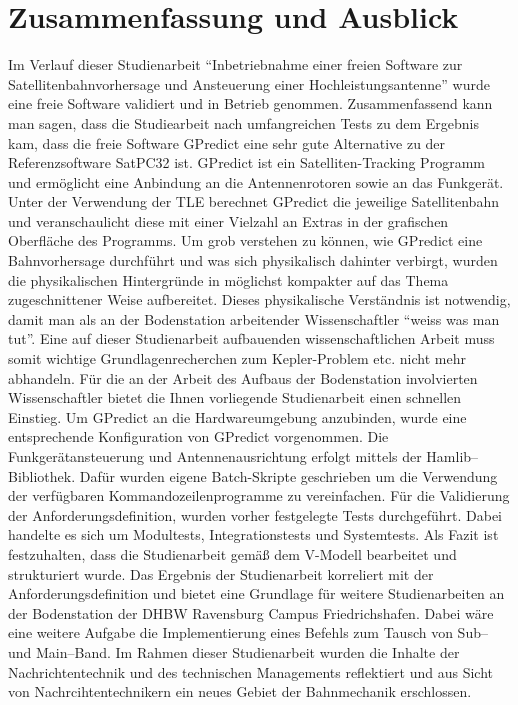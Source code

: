 
\chapter{Zusammenfassung und Ausblick}
Im Verlauf dieser Studienarbeit "`Inbetriebnahme einer freien Software zur Satellitenbahnvorhersage und Ansteuerung einer Hochleistungsantenne"' wurde eine freie Software validiert und in Betrieb genommen. Zusammenfassend kann man sagen, dass die Studiearbeit nach umfangreichen Tests zu dem Ergebnis kam, dass die freie Software GPredict eine sehr gute Alternative zu der Referenzsoftware SatPC32 ist. 
\newpar
GPredict ist ein Satelliten-Tracking Programm und ermöglicht eine Anbindung an die Antennenrotoren sowie 
an das Funkgerät. Unter der Verwendung der \ac{TLE} berechnet GPredict die jeweilige Satellitenbahn und veranschaulicht diese mit einer Vielzahl an Extras in der grafischen Oberfläche des Programms. Um grob verstehen zu können, wie GPredict eine Bahnvorhersage durchführt und was sich physikalisch dahinter verbirgt, wurden die physikalischen Hintergründe in möglichst kompakter auf das Thema zugeschnittener Weise aufbereitet. Dieses physikalische Verständnis ist notwendig, damit man als an der Bodenstation arbeitender Wissenschaftler "`weiss was man tut"'. Eine auf dieser Studienarbeit aufbauenden wissenschaftlichen Arbeit muss somit wichtige Grundlagenrecherchen zum Kepler-Problem etc. nicht mehr abhandeln. Für die an der Arbeit des Aufbaus der Bodenstation involvierten Wissenschaftler bietet die Ihnen vorliegende Studienarbeit einen schnellen Einstieg.     
\newpar
Um GPredict an die Hardwareumgebung anzubinden, wurde eine entsprechende Konfiguration von GPredict vorgenommen. Die Funkgerätansteuerung und Antennenausrichtung erfolgt mittels der Hamlib--Bibliothek. Dafür wurden eigene Batch-Skripte geschrieben um die Verwendung der verfügbaren Kommandozeilenprogramme zu vereinfachen. 
\newpar
Für die Validierung der Anforderungsdefinition, wurden vorher festgelegte Tests durchgeführt. Dabei handelte es sich um Modultests, Integrationstests und Systemtests. 
\newpar
Als Fazit ist festzuhalten, dass die Studienarbeit gemäß dem V-Modell bearbeitet und strukturiert wurde. Das Ergebnis der Studienarbeit korreliert mit der Anforderungsdefinition und bietet eine Grundlage für weitere Studienarbeiten an der Bodenstation der DHBW Ravensburg Campus Friedrichshafen. Dabei wäre eine weitere Aufgabe die Implementierung eines Befehls zum Tausch von Sub-- und Main--Band.
\newpar
Im Rahmen dieser Studienarbeit wurden die Inhalte der Nachrichtentechnik und des technischen Managements reflektiert und aus Sicht von Nachrcihtentechnikern ein neues Gebiet der Bahnmechanik erschlossen. 
\clearpage
